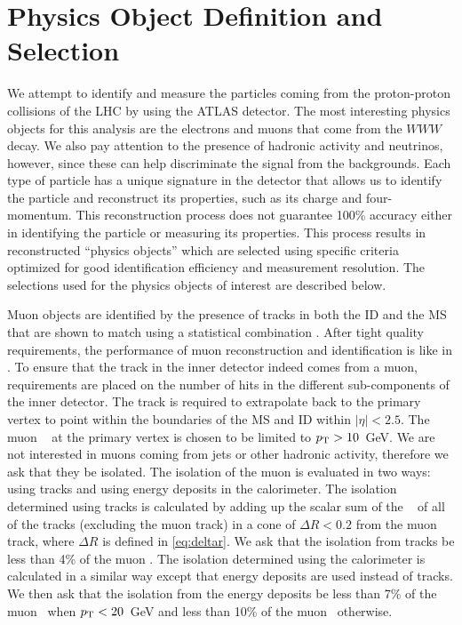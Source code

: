 \section{Physics Object Definition and Selection}
\label{sec:object_selection}
We attempt to identify and measure the particles coming from
the proton-proton collisions of the LHC by using the ATLAS detector.
The most interesting physics objects
for this analysis are the electrons and muons
that come from the $WWW$ decay. We also pay attention to 
the presence of hadronic activity and neutrinos, however, since these can
help discriminate the signal from the backgrounds.
Each type of particle has a unique signature in the detector
that allows us to identify the particle and reconstruct 
its properties, such as its charge and four-momentum. 
This reconstruction process does not guarantee
100\% accuracy either in identifying the particle or measuring its 
properties.
This process results in reconstructed ``physics objects''
which are selected using specific criteria optimized
for good identification efficiency and measurement resolution.
The selections used for the physics objects of interest are described below.


Muon objects are identified by the presence of tracks in both 
the ID and the MS that are shown 
to match using a statistical combination \cite{Hassani:2007cy}. 
After tight quality requirements, the performance of muon reconstruction
and identification is like in \cite{Aad:2014rra}.
To ensure that the track in the inner detector
indeed comes from a muon, requirements are placed
on the number of hits in the different sub-components of the inner detector.
The track is required to extrapolate back to the primary vertex 
to point within the boundaries of the MS and ID
within $|\eta|<2.5$.
The muon \pt~ at the primary vertex is chosen to be limited to $p_{\mathrm{T}} > 10$~GeV.
We are not interested in 
muons coming from jets or other hadronic activity, therefore we
ask that they be isolated. The isolation of the muon is evaluated
in two ways: using tracks and using energy deposits in the calorimeter.
The isolation determined using tracks is calculated by adding
up the scalar sum of the \pt~ of all of the tracks (excluding
the muon track) in a cone of $\Delta R< 0.2$ from the muon track,
where $\Delta R$ is defined in \eqn\eqref{eq:deltar}.
We ask that the isolation from tracks be less than 4\% of the muon \pt.
The isolation determined using the calorimeter is calculated in
a similar way except that energy deposits are used instead of tracks.
We then ask that the isolation from the energy deposits 
be less than 7\% of the muon \pt~when $p_{\mathrm{T}} < 20$~GeV and 
less than 10\% of the muon \pt~otherwise. 





